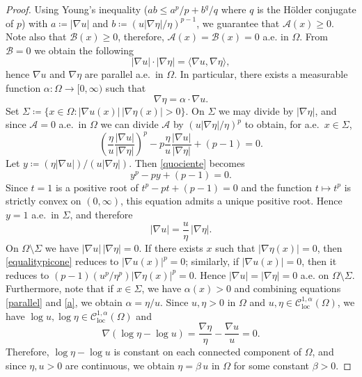 \documentclass{article}
\begin{document}
\begin{proof}
Using Young's inequality ($\displaystyle ab \leq a^p/p + b^q/q$ where $q$ is the Hölder conjugate of $p$) with $a \coloneq | \nabla u |$ and $b \coloneq \left( u | \nabla \eta |/\eta \right)^{p-1}$, we guarantee that $\mathcal{A}(x) \geq 0$. Note also that $\mathcal{B}(x)\geq 0$, therefore, $\mathcal{A}(x) = \mathcal{B}(x)=0$ a.e. in $\Omega$. From $\mathcal{B}=0$ we obtain the following
\[
|\nabla u|\cdot|\nabla\eta|=\langle \nabla u,\nabla\eta\rangle,
\]
hence $\nabla u$ and $\nabla\eta$ are parallel a.e.\ in $\Omega$. In particular, there exists a measurable function $\alpha:\Omega\to[0,\infty)$ such that
\begin{equation}\label{parallel}
\nabla \eta = \alpha \cdot \nabla u.
\end{equation} 
Set $\Sigma \coloneq \{x\in\Omega : |\nabla u(x)|\,|\nabla\eta(x)|>0\}$. 
On $\Sigma$ we may divide by $|\nabla\eta|$, and since $\mathcal{A}=0$ a.e.\ in $\Omega$ we can divide $\mathcal{A}$ by $(u|\nabla\eta|/\eta)^p$ to obtain, for a.e.\ $x\in\Sigma$,
\begin{equation}\label{quociente}
\left(\frac{\eta}{u}\frac{|\nabla u|}{|\nabla\eta|}\right)^p
- p\frac{\eta}{u}\frac{|\nabla u|}{|\nabla\eta|}
+ (p-1)=0 .
\end{equation}
Let  $y \coloneq \left( \eta | \nabla u | \right)/\left( u | \nabla \eta | \right)$. Then \eqref{quociente} becomes
\begin{equation}\label{eqdio}
y^p - py + (p-1)=0. 
\end{equation}
Since $t=1$ is a positive root of $t^p-pt+(p-1)=0$ and the function
$t\mapsto t^p$ is strictly convex on $(0,\infty)$, this equation admits a unique positive root. Hence $y=1$ a.e.\ in $\Sigma$, and therefore
\begin{equation}\label{a}
|\nabla u|=\frac{u}{\eta}\,|\nabla\eta|.
\end{equation}
On $\Omega\setminus\Sigma$ we have $|\nabla u|\,|\nabla\eta|=0$. If there exists $x$ such that $|\nabla\eta(x)|=0$, then \eqref{equalitypicone} reduces to
$|\nabla u(x)|^p=0$; similarly, if $|\nabla u(x)|=0$, then it reduces to
$(p-1)(u^p/\eta^p)|\nabla\eta(x)|^p=0$. Hence $|\nabla u|=|\nabla\eta|=0$ a.e. on $\Omega\setminus\Sigma$. Furthermore, note that if  $x \in \Sigma$, we have $\alpha(x)>0$ and combining equations \eqref{parallel} and \eqref{a}, we obtain $\alpha= \eta/u$. Since $u,\eta>0$ in $\Omega$ and $u,\eta\in \mathcal{C}^{1,\alpha}_{\mathrm{loc}}(\Omega)$,
we have $\log u,\log\eta \in \mathcal{C}^{1,\alpha}_{\mathrm{loc}}(\Omega)$ and
\[
\nabla(\log\eta-\log u)
= \frac{\nabla\eta}{\eta}-\frac{\nabla u}{u}=0.
\]
Therefore, $\log\eta-\log u$ is constant on each connected component of $\Omega$, and since $\eta,u>0$ are continuous,
we obtain $\eta=\beta\,u$ in $\Omega$ for some constant $\beta>0$.
\end{proof}
\end{document}
